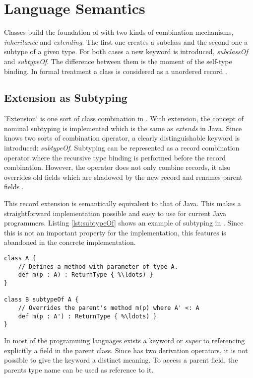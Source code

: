 \section{Language Semantics}
Classes build the foundation of \ooplss with two kinds of combination
mechanisms, \emph{inheritance} and \emph{extending}. The first
one creates a subclass and the second one a subtype of a given
type. For both cases a new keyword is introduced, \emph{subclassOf}
and \emph{subtypeOf}. The difference between them is the moment of
the self-type binding. In formal treatment a class is considered as a
unordered record \cite{simons_theory_2002-1}.

\subsection{Extension as Subtyping}
'Extension` is one sort of class combination in \ooplss. With extension,
the concept of nominal subtyping is implemented which is the same as
\emph{extends} in Java. Since \ooplss knows two sorts of combination operator, a
clearly distinguishable keyword is introduced: \emph{subtypeOf}. Subtyping
can be represented as a record combination operator where the recursive type binding
is performed before the record combination. However, the operator does
not only combine records, it also overrides old fields which are shadowed
by the new record and renames parent fields \cite{simons_theory_2003-2}.

This record extension is semantically equivalent to that of Java. This
makes a straightforward implementation possible and easy to use for
current Java programmers. Listing \ref{lst:subtypeOf} shows an example
of subtyping in \ooplss. Since this is not an important property for the
implementation, this features is abandoned in the concrete implementation.

\begin{lstlisting}[float=ht,language=ooplss,caption=Subtyping in \ooplss.,label=lst:subtypeOf]
class A {
	// Defines a method with parameter of type A.
	def m(p : A) : ReturnType { %\ldots) }
}

class B subtypeOf A {
	// Overrides the parent's method m(p) where A' <: A
	def m(p : A') : ReturnType { %\ldots) }
}
\end{lstlisting}

In most of the programming languages exists a keyword \base or
\emph{super} to referencing explicitly a field in the parent class. Since
\ooplss has two derivation operators, it is not possible to give the
keyword a distinct meaning. To access a parent field, the parents type
name can be used as reference to it.


